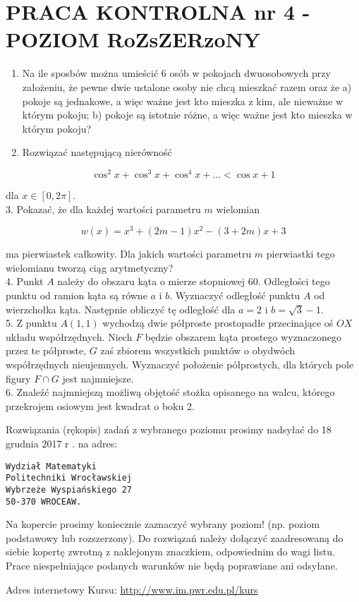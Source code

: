 \documentclass[10pt]{article}
\begin{document}
\section*{PRACA KONTROLNA nr 4 - POZIOM RoZsZERzoNY}
\begin{enumerate}
  \item Na ile sposbów można umieścić 6 osób w pokojach dwuosobowych przy założeniu, że pewne dwie ustalone osoby nie chcą mieszkać razem oraz że a) pokoje są jednakowe, a więc ważne jest kto mieszka z kim, ale nieważne w którym pokoju; b) pokoje są istotnie różne, a więc ważne jest kto mieszka w którym pokoju?
  \item Rozwiązać następującą nierówność
\end{enumerate}

$$
\cos ^{2} x+\cos ^{3} x+\cos ^{4} x+\ldots<\cos x+1
$$

dla $x \in[0,2 \pi]$.\\
3. Pokazać, że dla każdej wartości parametru $m$ wielomian

$$
w(x)=x^{3}+(2 m-1) x^{2}-(3+2 m) x+3
$$

ma pierwiastek całkowity. Dla jakich wartości parametru $m$ pierwiastki tego wielomianu tworzą ciąg arytmetyczny?\\
4. Punkt $A$ należy do obszaru kąta o mierze stopniowej 60. Odległości tego punktu od ramion kąta są równe $a$ i $b$. Wyznaczyć odległość punktu $A$ od wierzchołka kąta. Następnie obliczyć tę odległość dla $a=2$ i $b=\sqrt{3}-1$.\\
5. Z punktu $A(1,1)$ wychodzą dwie półproste prostopadłe przecinające oś $O X$ układu współrzędnych. Niech $F$ będzie obszarem kąta prostego wyznaczonego przez te półproste, $G$ zaś zbiorem wszystkich punktów o obydwóch współrzędnych nieujemnych. Wyznaczyć położenie półprostych, dla których pole figury $F \cap G$ jest najmniejsze.\\
6. Znaleźć najmniejszą możliwą objętość stożka opisanego na walcu, którego przekrojem osiowym jest kwadrat o boku 2.

Rozwiązania (rękopis) zadań z wybranego poziomu prosimy nadsyłać do 18 grudnia 2017 r . na adres:

\begin{verbatim}
Wydział Matematyki
Politechniki Wrocławskiej
Wybrzeże Wyspiańskiego 27
50-370 WROCEAW.
\end{verbatim}

Na kopercie prosimy koniecznie zaznaczyć wybrany poziom! (np. poziom podstawowy lub rozszerzony). Do rozwiązań należy dołączyć zaadresowaną do siebie kopertę zwrotną z naklejonym znaczkiem, odpowiednim do wagi listu. Prace niespełniające podanych warunków nie będą poprawiane ani odsyłane.

Adres internetowy Kursu: \href{http://www.im.pwr.edu.pl/kurs}{http://www.im.pwr.edu.pl/kurs}
\end{document}
